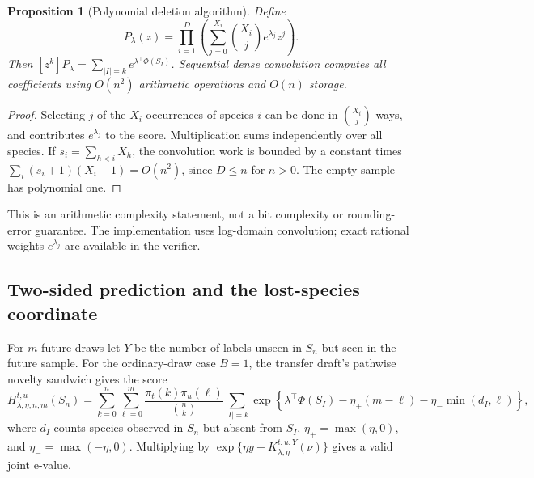\documentclass[11pt]{article}
\newtheorem{proposition}[theorem]{Proposition}
\theoremstyle{remark}\newtheorem{remark}[theorem]{Remark}
\begin{document}
\begin{proposition}[Polynomial deletion algorithm]\label{prop:poly}
Define
\[
 P_\lambda(z)=\prod_{i=1}^D
      \left(\sum_{j=0}^{X_i}\binom{X_i}{j}e^{\lambda_j}z^j\right).
\]
Then $[z^k]P_\lambda=\sum_{|I|=k}e^{\lambda^\top\Phi(S_I)}$.
Sequential dense convolution computes all coefficients using
$O(n^2)$ arithmetic operations and $O(n)$ storage.
\end{proposition}
\begin{proof}
Selecting $j$ of the $X_i$ occurrences of species $i$ can be done in
$\binom{X_i}{j}$ ways, and contributes $e^{\lambda_j}$ to the score.
Multiplication sums independently over all species.
If $s_i=\sum_{h<i}X_h$, the convolution work is bounded by a constant times
$\sum_i(s_i+1)(X_i+1)=O(n^2)$, since $D\le n$ for $n>0$.
The empty sample has polynomial one.
\end{proof}
This is an arithmetic complexity statement, not a bit complexity or
rounding-error guarantee. The implementation uses log-domain convolution;
exact rational weights $e^{\lambda_j}$ are available in the verifier.

\subsection{Two-sided prediction and the lost-species coordinate}
For $m$ future draws let $Y$ be the number of labels unseen in $S_n$
but seen in the future sample. For the ordinary-draw case $B=1$,
the transfer draft's pathwise novelty sandwich gives the score
\begin{equation}\label{eq:Hjoint}
 H_{\lambda,\eta;n,m}^{t,u}(S_n)=
 \sum_{k=0}^n\sum_{\ell=0}^m
 \frac{\pi_t(k)\pi_u(\ell)}{\binom nk}
 \sum_{|I|=k}\exp\!\left\{
 \lambda^\top\Phi(S_I)-\eta_+(m-\ell)
                         -\eta_-\min(d_I,\ell)\right\},
\end{equation}
where $d_I$ counts species observed in $S_n$ but absent from $S_I$,
$\eta_+=\max(\eta,0)$, and $\eta_-=\max(-\eta,0)$.
Multiplying by
$\exp\{\eta y-K_{\lambda,\eta}^{t,u,Y}(\nu)\}$ gives a valid joint e-value.
\end{document}
